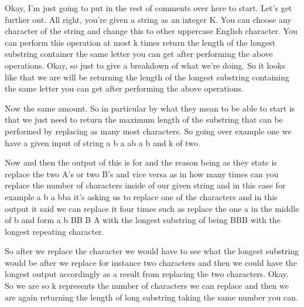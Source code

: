\expandafter\def\csname sourceexcerpt@28\endcsname{%
Okay, I'm just going to put in the rest of comments over here to start. Let's get
further out. All right, you're given a string as an integer K. You can choose any
character of the string and change this to other uppercase English character. You can
perform this operation at most k times return the length of the longest substring
container the same letter you can get after performing the above operations. Okay, so
just to give a breakdown of what we're doing. So it looks like that we are will be
returning the length of the longest substring containing the same letter you can get
after performing the above operations.

Now the same amount. So in particular by what they mean to be able to start is that we
just need to return the maximum length of the substring that can be performed by
replacing as many most characters. So going over example one we have a given input of
string a b a ab a b and k of two.

Now and then the output of this is for and the reason being as they state is replace
the two A's or two B's and vice versa as in how many times can you replace the number
of characters inside of our given string and in this case for example a b a bba it's
asking us to replace one of the characters and in this output it said we can replace
it four times such as replace the one a in the middle of b and form a b BB B A with
the longest substring of being BBB with the longest repeating character.

So after we replace the character we would have to see what the longest substring
would be after we replace for instance two characters and then we could have the
longest output accordingly as a result from replacing the two characters. Okay. So we
are so k represents the number of characters we can replace and then we are again
returning the length of long substring taking the same number you can.
}

